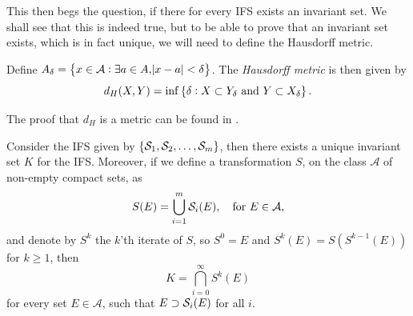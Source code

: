 This then begs the question, if there for every IFS exists an invariant set. We shall see that this is indeed true, but to be able to prove that an invariant set exists, which is in fact unique, we will need to define the Hausdorff metric.

\medskip
\begin{defi}
	Define $A_{\delta} = \cbr{x \in \mathcal{A} : \exists a \in A, \abs{x-a} < \delta }$. The \emph{Hausdorff metric} is then given by
	\begin{equation}
		d_H(X,Y) = \inf \cbr{\delta : X \subset Y_\delta \text{ and } Y \subset X_\delta}.
	\end{equation}
\end{defi}
The proof that $d_H$ is a metric can be found in \cite{Henrikson1999CompletenessAT}.

\clearpage
\begin{theorem}\label{uniqueInvariantSet}
	Consider the IFS given by $\cbr{\fracConst_1, \fracConst_2, \ldots, \fracConst_m}$, then there exists a unique invariant set $K$ for the IFS. Moreover, if we define a transformation $S$, on the class $\mathcal{A}$ of non-empty compact sets, as
	\begin{equation}
		S(E) = \bigcup_{i = 1}^{m} \mathcal{S}_i(E), \quad \text{for } E \in \mathcal{A},
	\end{equation}
	and denote by $S^k$ the $k$'th iterate of $S$, so $S^{0} = E$ and $S^{k}(E) = S(S^{k-1}(E))$ for $k \geq 1$, then
	\begin{equation}
		K = \bigcap_{i = 0}^{\infty} S^{k}(E)
	\end{equation}
	for every set $E \in \mathcal{A}$, such that $E \supset \mathcal{S}_i(E)$ for all $i$.
\end{theorem}


